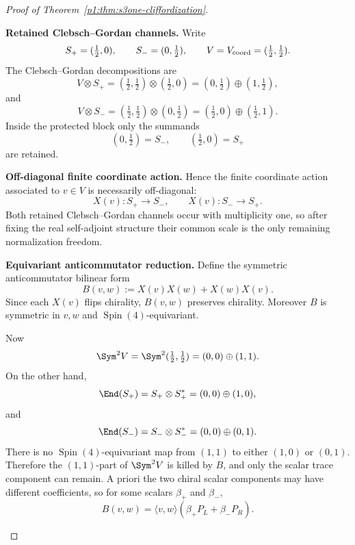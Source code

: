 \documentclass[11pt]{article}
\begin{document}
\begin{proof}[Proof of Theorem~\ref{p1:thm:s3one-cliffordization}]

\begin{proofsteps}
\item \textbf{Retained Clebsch--Gordan channels.}
Write
\[
    S_+=(\tfrac12,0),
    \qquad
    S_-=(0,\tfrac12),
    \qquad
    V=V_{\rm coord}=(\tfrac12,\tfrac12).
\]
The Clebsch--Gordan decompositions are
\[
    V\otimes S_+
    =
    (\tfrac12,\tfrac12)\otimes(\tfrac12,0)
    =
    (0,\tfrac12)\oplus(1,\tfrac12),
\]
and
\[
    V\otimes S_-
    =
    (\tfrac12,\tfrac12)\otimes(0,\tfrac12)
    =
    (\tfrac12,0)\oplus(\tfrac12,1).
\]
Inside the protected block only the summands
\[
    (0,\tfrac12)=S_-,
    \qquad
    (\tfrac12,0)=S_+
\]
are retained.

\item \textbf{Off-diagonal finite coordinate action.}
Hence the finite coordinate action associated to
\(v\in V\) is necessarily off-diagonal:
\[
    X(v):S_+\to S_-,
    \qquad
    X(v):S_-\to S_+.
\]
Both retained Clebsch--Gordan channels occur with multiplicity one, so after
fixing the real self-adjoint structure their common scale is the only remaining
normalization freedom.

\item \textbf{Equivariant anticommutator reduction.}
Define the symmetric anticommutator bilinear form
\[
    B(v,w):=X(v)X(w)+X(w)X(v).
\]
Since each \(X(v)\) flips chirality, \(B(v,w)\) preserves chirality.  Moreover
\(B\) is symmetric in \(v,w\) and \(\operatorname{Spin}(4)\)-equivariant.

Now
\[
    \Sym^2 V
    =
    \Sym^2(\tfrac12,\tfrac12)
    =
    (0,0)\oplus(1,1).
\]
On the other hand,
\[
    \End(S_+)
    =
    S_+\otimes S_+^*
    =
    (0,0)\oplus(1,0),
\]
and
\[
    \End(S_-)
    =
    S_-\otimes S_-^*
    =
    (0,0)\oplus(0,1).
\]
There is no \(\operatorname{Spin}(4)\)-equivariant map from \((1,1)\) to either
\((1,0)\) or \((0,1)\).  Therefore the \((1,1)\)-part of
\(\Sym^2V\) is killed by \(B\), and only the scalar trace component can remain.
A priori the two chiral scalar components may have different coefficients, so
for some scalars \(\beta_+\) and \(\beta_-\),
\[
    B(v,w)=\langle v,w\rangle(\beta_+P_L+\beta_-P_R).
\]


\end{proofsteps}
\end{proof}
\end{document}
